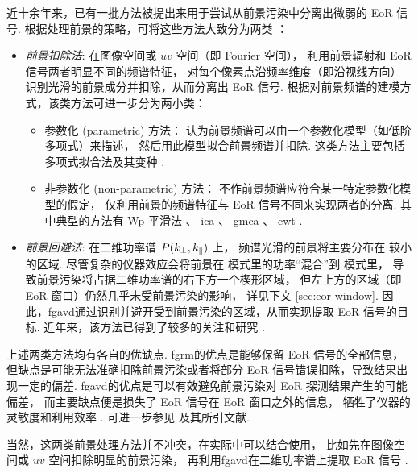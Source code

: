 近十余年来，已有一批方法被提出来用于尝试从前景污染中分离出微弱的 EoR 信号.
根据处理前景的策略，可将这些方法大致分为两类 \cite{chapman2015,chapman2016}：
\begin{itemize}
\item \emph{前景扣除法}:
在图像空间或 $uv$ 空间（即 Fourier 空间），
利用前景辐射和 EoR 信号两者明显不同的频谱特征，
对每个像素点沿频率维度（即沿视线方向）识别光滑的前景成分并扣除，从而分离出 EoR 信号.
根据对前景频谱的建模方式，该类方法可进一步分为两小类：
\begin{itemize}
  \item 参数化 (parametric) 方法：
    认为前景频谱可以由一个参数化模型（如低阶多项式）来描述，
    然后用此模型拟合前景频谱并扣除.
    这类方法主要包括多项式拟合法及其变种
    \cite{wang2006,jelic2008,liu2009fgrm,wang2013,bonaldi2015}.
  \item 非参数化 (non-parametric) 方法：
    不作前景频谱应符合某一特定参数化模型的假定，
    仅利用前景的频谱特征与 EoR 信号不同来实现两者的分离.
    其中典型的方法有
    Wp 平滑法 \cite{harker2009}、
    \ac{ica} \cite{chapman2012}、
    \ac{gmca} \cite{chapman2013}、
    \ac{cwt} \cite{gu2013}.
\end{itemize}

\item \emph{前景回避法}:
在二维功率谱 $P(k_{\bot}, k_{\parallel})$ 上，
频谱光滑的前景将主要分布在 \klos{} 较小的区域.
尽管复杂的仪器效应会将前景在 \kperp{} 模式里的功率\enquote{混合}到 \klos{} 模式里，
导致前景污染将占据二维功率谱的右下方一个楔形区域，
但左上方的区域（即 EoR 窗口）仍然几乎未受前景污染的影响，
详见下文 \autoref{sec:eor-window}.
因此，\ac{fgavd}通过识别并避开受到前景污染的区域，从而实现提取 EoR 信号的目标.
近年来，该方法已得到了较多的关注和研究 \cite{thyagarajan2013,liu2014,liu2014ii,
  barry2016,beardsley2016,trott2016,patil2017}.

\end{itemize}

上述两类方法均有各自的优缺点.
\ac{fgrm}的优点是能够保留 EoR 信号的全部信息，
但缺点是可能无法准确扣除前景污染或者将部分 EoR 信号错误扣除，导致结果出现一定的偏差.
\ac{fgavd}的优点是可以有效避免前景污染对 EoR 探测结果产生的可能偏差，
而主要缺点便是损失了 EoR 信号在 EoR 窗口之外的信息，
牺牲了仪器的灵敏度和利用效率 \cite{pober2014}.
可进一步参见  及其所引文献.

当然，这两类前景处理方法并不冲突，在实际中可以结合使用，
比如先在图像空间或 $uv$ 空间扣除明显的前景污染，
再利用\ac{fgavd}在二维功率谱上提取 EoR 信号 \cite{datta2010}.


